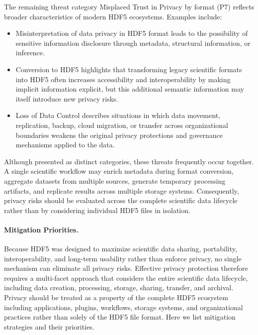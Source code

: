 \documentclass[../main.tex]{subfiles}
\begin{document}
The remaining threat category Misplaced Trust in Privacy by format (P7) reflects broader 
characteristics of modern HDF5 ecosystems. Examples include: 

\begin{itemize}

\item Misinterpretation of data privacy in HDF5 format leads to the possibility of 
sensitive information disclosure through metadata, structural information, or inference.

\item Conversion to HDF5 highlights that transforming legacy scientific formats 
into HDF5 often increases accessibility and interoperability by making implicit 
information explicit, but this additional semantic information may itself introduce new privacy risks. 

\item Loss of Data Control describes situations in which data movement, replication, 
backup, cloud migration, or transfer across organizational boundaries weakens the 
original privacy protections and governance mechanisms applied to the data.

\end{itemize}

Although presented as distinct categories, these threats frequently occur together. 
A single scientific workflow may enrich metadata during format conversion, aggregate 
datasets from multiple sources, generate temporary processing artifacts, and 
replicate results across multiple storage systems. Consequently, privacy risks should 
be evaluated across the complete scientific data lifecycle rather than 
by considering individual HDF5 files in isolation.

\paragraph{Mitigation Priorities.}
Because HDF5 was designed to maximize scientific data sharing, portability, 
interoperability, and long-term usability rather than enforce privacy, 
no single mechanism can eliminate all privacy risks. Effective privacy protection 
therefore requires a multi-facet approach that considers the entire scientific data 
lifecycle, including data creation, processing, storage, sharing, transfer, 
and archival. Privacy should be treated as a property of the complete HDF5 ecosystem 
including applications, plugins, workflows, storage systems, and organizational 
practices rather than solely of the HDF5 file format. 
Here we list mitigation strategies and their priorities.
\end{document}
